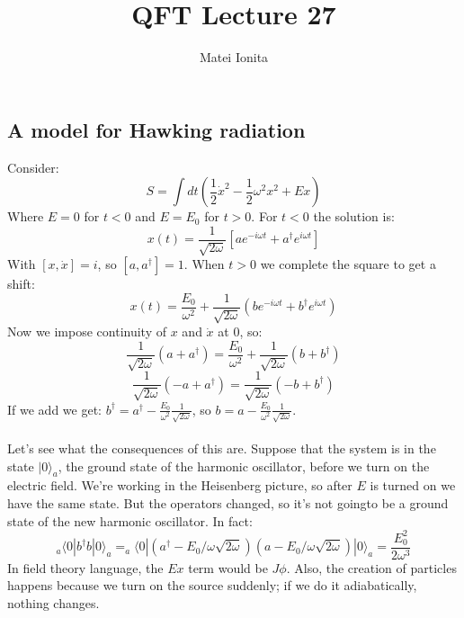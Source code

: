 \documentclass[12 pt]{article}
\title{QFT Lecture 27}
\author{Matei Ionita}
\begin{document}
  \maketitle

\subsection*{A model for Hawking radiation}
Consider:
\[     S = \int dt \left(  \frac{1}{2} \dot x^2 - \frac{1}{2} \omega^2 x^2 + E x  \right)     \]
Where $E=0$ for $t<0$ and $E = E_0$ for $t>0$. For $t<0$ the solution is:
\[       x(t) = \frac{1}{\sqrt{2\omega}} \left[  a e^{-i\omega t} + a^{\dagger} e^{i\omega t}  \right]      \]
With $[x, \dot x] = i$, so $[a, a^{\dagger}] = 1$. When $t>0$ we complete the square to get a shift:
\[       x(t) = \frac{E_0}{\omega^2} + \frac{1}{\sqrt{2\omega}} \left( b e^{-i\omega t} + b^{\dagger} e^{i\omega t}  \right)           \]
Now we impose continuity of $x$ and $\dot x$ at 0, so:
\[       \frac{1}{\sqrt{2\omega}} (a + a^{\dagger}) =    \frac{E_0}{\omega^2} + \frac{1}{\sqrt{2\omega}} \left( b  + b^{\dagger}   \right)       \]
\[         \frac{1}{\sqrt{2\omega}} (-a + a^{\dagger}) =   \frac{1}{\sqrt{2\omega}} \left(- b  + b^{\dagger}   \right)         \]
If we add we get: $b^{\dagger} = a^{\dagger} - \frac{E_0}{\omega^2} \frac{1}{\sqrt{2\omega}}$, so $b = a - \frac{E_0}{\omega^2} \frac{1}{\sqrt{2\omega}}$.
\\
\\
Let's see what the consequences of this are. Suppose that the system is in the state $|0\rangle_{a}$, the ground state of the harmonic oscillator, before we turn on the electric field. We're working in the Heisenberg picture, so after $E$ is turned on we have the same state. But the operators changed, so it's not goingto be a ground state of the new harmonic oscillator. In fact:
\[     _a\langle 0| b^{\dagger} b |0\rangle_a   = _a\langle 0|  (a^{\dagger} - E_0/\omega \sqrt{2\omega} )(a - E_0/\omega \sqrt{2\omega} )  | 0\rangle_a = \frac{E_0^2}{2\omega^3}  \]
In field theory language, the $Ex$ term would be $J\phi$. Also, the creation of particles happens because we turn on the source suddenly; if we do it adiabatically, nothing changes.
\end{document}

